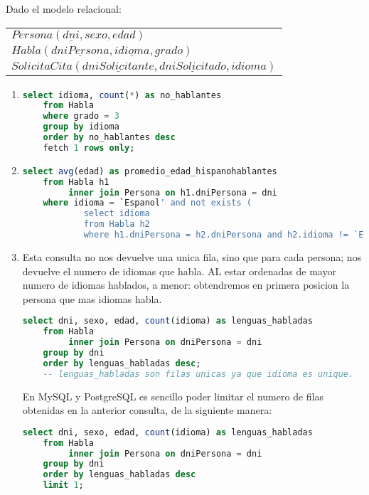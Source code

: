 Dado el modelo relacional:
\begin{center}
	\begin{tabular}{l}
		$Persona(\underline{dni}, sexo, edad)$\\
		$Habla(\underline{dniPersona}, \underline{idioma}, grado)$\\
		$SolicitaCita(\underline{dniSolicitante}, \underline{dniSolicitado}, idioma)$\\	
	\end{tabular}
\end{center}

\begin{enumerate}
	
	\item 
	\begin{lstlisting}[language=sql]
	select idioma, count(*) as no_hablantes
	from Habla
	where grado = 3
	group by idioma
	order by no_hablantes desc
	fetch 1 rows only;\end{lstlisting}
	
	\item 
	\begin{lstlisting}[language=sql]
	select avg(edad) as promedio_edad_hispanohablantes
	from Habla h1
		 inner join Persona on h1.dniPersona = dni
	where idioma = `Espanol' and not exists (
			select idioma
			from Habla h2
			where h1.dniPersona = h2.dniPersona and h2.idioma != `Espanol');\end{lstlisting}
			
	\item 
	Esta consulta no nos devuelve una unica fila, sino que para cada persona; nos devuelve el numero de idiomas que habla. AL estar ordenadas de mayor numero de idiomas hablados, a menor: obtendremos en primera posicion la persona que mas idiomas habla.
	\begin{lstlisting}[language=sql]
	select dni, sexo, edad, count(idioma) as lenguas_habladas
	from Habla
		 inner join Persona on dniPersona = dni
	group by dni
	order by lenguas_habladas desc;
	-- lenguas_habladas son filas unicas ya que idioma es unique.\end{lstlisting}
	
	\newpage
	En MySQL y PostgreSQL es sencillo poder limitar el numero de filas obtenidas en la anterior consulta, de la siguiente manera:
	\begin{lstlisting}[language=sql]
	select dni, sexo, edad, count(idioma) as lenguas_habladas
	from Habla
		 inner join Persona on dniPersona = dni
	group by dni
	order by lenguas_habladas desc
	limit 1;\end{lstlisting}
	

\end{enumerate}
